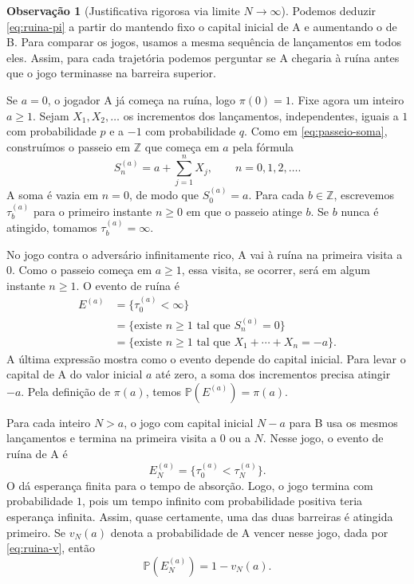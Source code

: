 \documentclass[12pt,portuguese]{article}
\theoremstyle{definition}
\newtheorem{remark}[remark]{Observação}
\theoremstyle{plainexercise}
\theoremstyle{starredexercise}
\theoremstyle{definition}
\begin{document}
\begin{remark}[Justificativa rigorosa via limite $N \to \infty$]\label{rem:ruina-limite}
  Podemos deduzir \eqref{eq:ruina-pi} a partir do
   mantendo fixo o capital inicial de A e
  aumentando o de B. Para comparar os jogos, usamos a mesma sequência de
  lançamentos em todos eles. Assim, para cada trajetória podemos perguntar
  se A chegaria à ruína antes que o jogo terminasse na barreira superior.

  Se $a = 0$, o jogador A já começa na ruína, logo $\pi(0) = 1$. Fixe agora
  um inteiro $a \geqslant 1$. Sejam $X_1, X_2, \ldots$ os incrementos dos
  lançamentos, independentes, iguais a $1$ com probabilidade $p$ e a $-1$
  com probabilidade $q$. Como em \eqref{eq:passeio-soma}, construímos o
  passeio em $\mathbb{Z}$ que começa em $a$ pela fórmula
  \[
    S_n^{(a)} = a + \sum_{j=1}^n X_j, \qquad n = 0, 1, 2, \ldots.
  \]
  A soma é vazia em $n = 0$, de modo que $S_0^{(a)} = a$. Para cada
  $b \in \mathbb{Z}$, escrevemos $\tau_b^{(a)}$ para o primeiro instante
  $n \geqslant 0$ em que o passeio atinge $b$. Se $b$ nunca é atingido,
  tomamos $\tau_b^{(a)} = \infty$.

  No jogo contra o adversário infinitamente rico, A vai à ruína na
  primeira visita a $0$. Como o passeio começa em $a \geqslant 1$, essa
  visita, se ocorrer, será em algum instante $n \geqslant 1$. O evento de
  ruína é
  \[
    \begin{aligned}
      E^{(a)} &= \{\tau_0^{(a)} < \infty\} \\
              &= \{\text{existe } n \geqslant 1 \text{ tal que } S_n^{(a)} = 0\} \\
              &= \{\text{existe } n \geqslant 1 \text{ tal que } X_1 + \cdots + X_n = -a\}.
    \end{aligned}
  \]
  A última expressão mostra como o evento depende do capital inicial. Para
  levar o capital de A do valor inicial $a$ até zero, a soma dos incrementos
  precisa atingir $-a$. Pela definição de $\pi(a)$, temos
  $\mathbb{P}(E^{(a)}) = \pi(a)$.

  Para cada inteiro $N > a$, o jogo com capital inicial $N - a$ para B usa
  os mesmos lançamentos e termina na primeira visita a $0$ ou a $N$. Nesse
  jogo, o evento de ruína de A é
  \[
    E_N^{(a)} = \{\tau_0^{(a)} < \tau_N^{(a)}\}.
  \]
  O  dá esperança finita para o tempo de absorção.
  Logo, o jogo termina com probabilidade $1$, pois um tempo infinito com
  probabilidade positiva teria esperança infinita. Assim, quase certamente,
  uma das duas barreiras é atingida primeiro. Se $v_N(a)$ denota a
  probabilidade de A vencer nesse jogo, dada por \eqref{eq:ruina-v}, então
  \[
    \mathbb{P}(E_N^{(a)}) = 1 - v_N(a).
  \]


\end{remark}
\end{document}
